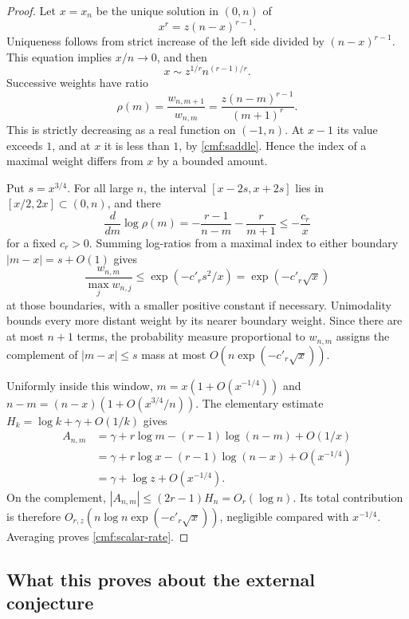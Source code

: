 \documentclass[11pt,a4paper]{article}
\numberwithin{equation}{section}
\theoremstyle{definition}
\theoremstyle{remark}
\begin{document}
\begin{proof}
Let $x=x_n$ be the unique solution in $(0,n)$ of
\begin{equation}\label{cmf:saddle}
 x^r=z(n-x)^{r-1}.
\end{equation}
Uniqueness follows from strict increase of the left side divided by
$(n-x)^{r-1}$. This equation implies $x/n\to0$, and then
\[
 x\sim z^{1/r}n^{(r-1)/r}.
\]
Successive weights have ratio
\begin{equation}\label{cmf:weight-ratio}
 \rho(m)=\frac{w_{n,m+1}}{w_{n,m}}
        =\frac{z(n-m)^{r-1}}{(m+1)^r}.
\end{equation}
This is strictly decreasing as a real function on $(-1,n)$.
At $x-1$ its value exceeds $1$, and at $x$ it is less than $1$,
by \eqref{cmf:saddle}. Hence the index of a maximal weight differs
from $x$ by a bounded amount.

Put $s=x^{3/4}$. For all large $n$, the interval
$[x-2s,x+2s]$ lies in $[x/2,2x]\subset(0,n)$, and there
\[
 \frac{d}{dm}\log\rho(m)
 =-\frac{r-1}{n-m}-\frac r{m+1}\le-\frac{c_r}{x}
\]
for a fixed $c_r>0$. Summing log-ratios from a maximal index
to either boundary $|m-x|=s+O(1)$ gives
\[
 \frac{w_{n,m}}{\max_j w_{n,j}}
 \le \exp(-c'_r s^2/x)=\exp(-c'_r\sqrt x)
\]
at those boundaries, with a smaller positive constant if necessary.
Unimodality bounds every more distant weight by its nearer boundary
weight. Since there are at most $n+1$ terms, the probability measure
proportional to $w_{n,m}$ assigns the complement of
$|m-x|\le s$ mass at most
$O(n\exp(-c'_r\sqrt x))$.

Uniformly inside this window, $m=x(1+O(x^{-1/4}))$ and
$n-m=(n-x)(1+O(x^{3/4}/n))$. The elementary estimate
$H_k=\log k+\gamma+O(1/k)$ gives
\begin{align*}
 A_{n,m}
 &=\gamma+r\log m-(r-1)\log(n-m)+O(1/x)\\
 &=\gamma+r\log x-(r-1)\log(n-x)+O(x^{-1/4})\\
 &=\gamma+\log z+O(x^{-1/4}).
\end{align*}
On the complement, $|A_{n,m}|\le(2r-1)H_n=O_r(\log n)$.
Its total contribution is therefore
$O_{r,z}(n\log n\exp(-c'_r\sqrt x))$, negligible compared
with $x^{-1/4}$. Averaging proves
\eqref{cmf:scalar-rate}.
\end{proof}

\subsection{What this proves about the external conjecture}
\end{document}
